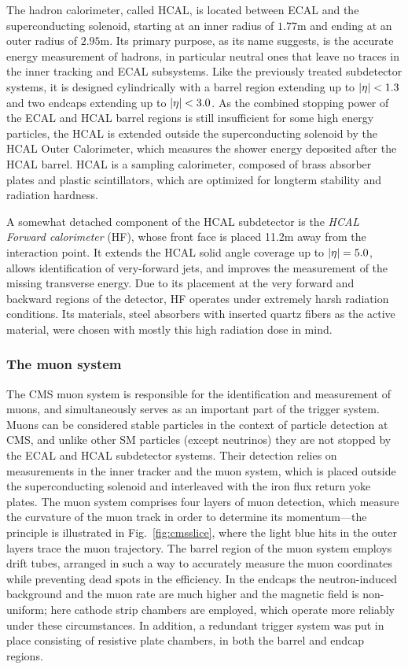 The hadron calorimeter, called HCAL, is located between ECAL and the superconducting solenoid, starting at an inner radius of $1.77$\unit{m} and ending at an outer radius of $2.95$\unit{m}.
% 
Its primary purpose, as its name suggests, is the accurate energy measurement of hadrons, in particular neutral ones that leave no traces in the inner tracking and ECAL subsystems.
% 
Like the previously treated subdetector systems, it is designed cylindrically with a barrel region extending up to $\left| \eta \right | < 1.3$ and two endcaps extending up to $\left| \eta \right | < 3.0$.
% 
As the combined stopping power of the ECAL and HCAL barrel regions is still insufficient for some high energy particles, the HCAL is extended outside the superconducting solenoid by the HCAL Outer Calorimeter, which measures the shower energy deposited after the HCAL barrel.
% 
HCAL is a sampling calorimeter, composed of brass absorber plates and plastic scintillators, which are optimized for longterm stability and radiation hardness.


A somewhat detached component of the HCAL subdetector is the \textit{HCAL Forward calorimeter} (HF), whose front face is placed 11.2\unit{m} away from the interaction point.
% 
It extends the HCAL solid angle coverage up to $\left| \eta \right | = 5.0$, allows identification of very-forward jets, and improves the measurement of the missing transverse energy.
% 
Due to its placement at the very forward and backward regions of the detector, HF operates under extremely harsh radiation conditions.
% 
Its materials, steel absorbers with inserted quartz fibers as the active material, were chosen with mostly this high radiation dose in mind.



\subsubsection{The muon system}

The CMS muon system is responsible for the identification and measurement of muons, and simultaneously serves as an important part of the trigger system.
% 
Muons can be considered stable particles in the context of particle detection at CMS, and unlike other SM particles (except neutrinos) they are not stopped by the ECAL and HCAL subdetector systems.
% 
Their detection relies on measurements in the inner tracker and the muon system, which is placed outside the superconducting solenoid and interleaved with the iron flux return yoke plates.
% 
The muon system comprises four layers of muon detection, which measure the curvature of the muon track in order to determine its momentum---the principle is illustrated in Fig.~\ref{fig:cmsslice}, where the light blue hits in the outer layers trace the muon trajectory.
% 
The barrel region of the muon system employs drift tubes, arranged in such a way to accurately measure the muon coordinates while preventing dead spots in the efficiency.
% 
In the endcaps the neutron-induced background and the muon rate are much higher and the magnetic field is non-uniform; here cathode strip chambers are employed, which operate more reliably under these circumstances.
% 
In addition, a redundant trigger system was put in place consisting of resistive plate chambers, in both the barrel and endcap regions.



